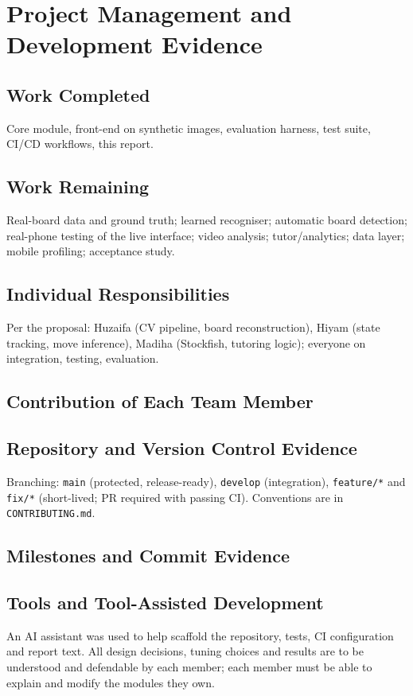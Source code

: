 \chapter{Project Management and Development Evidence}
\section{Work Completed}
Core module, front-end on synthetic images, evaluation harness, test suite, CI/CD workflows, this report.
\section{Work Remaining}
Real-board data and ground truth; learned recogniser; automatic board detection; real-phone testing of the live interface;
video analysis; tutor/analytics; data layer; mobile profiling; acceptance study.
\section{Individual Responsibilities}
Per the proposal: Huzaifa (CV pipeline, board reconstruction), Hiyam (state tracking, move inference), Madiha
(Stockfish, tutoring logic); everyone on integration, testing, evaluation.
\section{Contribution of Each Team Member}
\section{Repository and Version Control Evidence}
Branching: \texttt{main} (protected, release-ready), \texttt{develop} (integration), \texttt{feature/*} and \texttt{fix/*}
(short-lived; PR required with passing CI). Conventions are in \texttt{CONTRIBUTING.md}.
\section{Milestones and Commit Evidence}
\section{Tools and Tool-Assisted Development}
An AI assistant was used to help scaffold the repository, tests, CI configuration and report text. All design
decisions, tuning choices and results are to be understood and defendable by each member; each member must be
able to explain and modify the modules they own.
